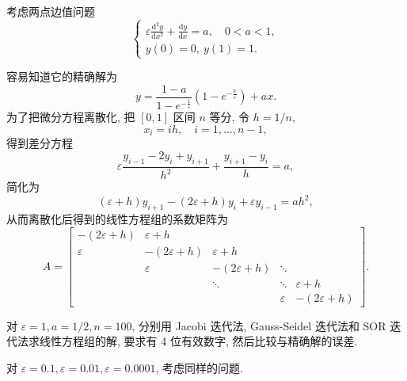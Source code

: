\documentclass{article}
\begin{document}
考虑两点边值问题
\[
  \begin{cases}
    \varepsilon \frac{\mathrm{d}^2 y}{\mathrm{d}x^2} +
    \frac{\mathrm{d} y}{\mathrm{d}x} = a, \quad 0 < a < 1, \\
    y(0) = 0, \ y(1) = 1.
  \end{cases}
\]

容易知道它的精确解为
\[
  y = \frac{1 - a}{1 - e^{-\frac{1}{\varepsilon}}} (1 -
  e^{-\frac{x}{\varepsilon}}) + ax.
\]
为了把微分方程离散化, 把 $[0,1]$ 区间 $n$ 等分, 令 $h = 1/n$,
\[
  x_i = ih, \quad i = 1, \dots, n-1,
\]
得到差分方程
\[
  \varepsilon \frac{y_{i-1} - 2y_i + y_{i+1}}{h^2} + \frac{y_{i+1} -
  y_i}{h} = a,
\]
简化为
\[
  (\varepsilon + h) y_{i+1} - (2\varepsilon + h) y_i + \varepsilon
  y_{i-1} = ah^2,
\]
从而离散化后得到的线性方程组的系数矩阵为
\[
  A =
  \begin{bmatrix}
    -(2\varepsilon + h) & \varepsilon + h & & & \\
    \varepsilon & -(2\varepsilon + h) & \varepsilon + h & & \\
    & \varepsilon & -(2\varepsilon + h) & \ddots & \\
    & & \ddots & \ddots & \varepsilon + h \\
    & & & \varepsilon & -(2\varepsilon + h)
  \end{bmatrix}.
\]

对 $\varepsilon = 1, a = 1/2, n = 100$, 分别用 Jacobi 迭代法, Gauss-Seidel
迭代法和 SOR 迭代法求线性方程组的解, 要求有 4 位有效数字, 然后比较与精确解的误差.

对 $\varepsilon = 0.1, \varepsilon = 0.01, \varepsilon = 0.0001$, 考虑同样的问题.
\end{document}

